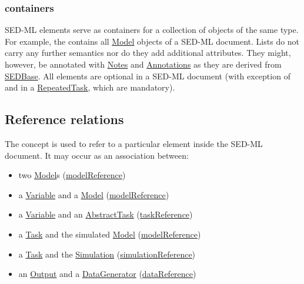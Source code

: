 \subsubsection{ containers}
\label{sec:listOf}
SED-ML  elements serve as containers for a collection of objects of the same type. For example, the \hyperref[sec:listOfModels]{} contains all \hyperref[class:model]{Model} objects of a SED-ML document. Lists do not carry any further semantics nor do they add additional attributes. They might, however, be annotated with \hyperref[class:notes]{Notes} and \hyperref[class:annotation]{Annotations} as they are derived from \hyperref[class:sedBase]{SEDBase}. All  elements are optional in a SED-ML document (with exception of \hyperref[sec:listOfRanges]{} and \hyperref[class:subTask]{} in a \hyperref[class:repeatedTask]{RepeatedTask}, which are mandatory).


\subsection{Reference relations}
\label{sec:reference}

The  concept is used to refer to a particular element inside the SED-ML document. It may occur as an association between:

\begin{itemize}
	\item{two \hyperref[class:model]{Model}s (\hyperref[sec:modelReference]{modelReference})}
	\item{a \hyperref[class:variable]{Variable} and a \hyperref[class:model]{Model} (\hyperref[sec:modelReference]{modelReference})}
	\item{a \hyperref[class:variable]{Variable} and an \hyperref[class:abstractTask]{AbstractTask} (\hyperref[sec:taskReference]{taskReference})}
	\item{a \hyperref[class:task]{Task} and the simulated \hyperref[class:model]{Model} (\hyperref[sec:modelReference]{modelReference})}
	\item{a \hyperref[class:task]{Task} and the \hyperref[class:simulation]{Simulation} (\hyperref[sec:simulationReference]{simulationReference})}
	\item{an \hyperref[class:output]{Output} and a \hyperref[class:dataGenerator]{DataGenerator} (\hyperref[sec:dataReference]{dataReference})}
\end{itemize}

